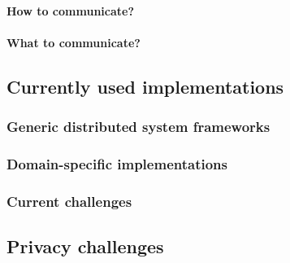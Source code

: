 \paragraph{How to communicate?}
\paragraph{What to communicate?}










\subsection{Currently used implementations}
\subsubsection{Generic distributed system frameworks}
\subsubsection{Domain-specific implementations}
\subsubsection{Current challenges}










\subsection{Privacy challenges}